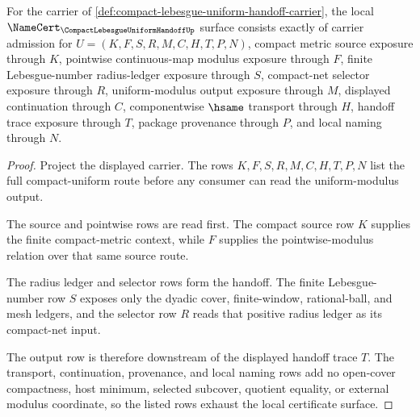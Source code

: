 \begin{theorem}
\label{thm:compact-lebesgue-uniform-handoff-namecert-obligations}
For the carrier of \autoref{def:compact-lebesgue-uniform-handoff-carrier}, the local $\NameCert_{\CompactLebesgueUniformHandoffUp}$ surface consists exactly of carrier admission for $U=(K,F,S,R,M,C,H,T,P,N)$, compact metric source exposure through $K$, pointwise continuous-map modulus exposure through $F$, finite Lebesgue-number radius-ledger exposure through $S$, compact-net selector exposure through $R$, uniform-modulus output exposure through $M$, displayed continuation through $C$, componentwise $\hsame$ transport through $H$, handoff trace exposure through $T$, package provenance through $P$, and local naming through $N$.
\end{theorem}
\begin{proof}
Project the displayed carrier. The rows $K,F,S,R,M,C,H,T,P,N$ list the full compact-uniform route before any consumer can read the uniform-modulus output.

The source and pointwise rows are read first. The compact source row $K$ supplies the finite compact-metric context, while $F$ supplies the pointwise-modulus relation over that same source route.

The radius ledger and selector rows form the handoff. The finite Lebesgue-number row $S$ exposes only the dyadic cover, finite-window, rational-ball, and mesh ledgers, and the selector row $R$ reads that positive radius ledger as its compact-net input.

The output row is therefore downstream of the displayed handoff trace $T$. The transport, continuation, provenance, and local naming rows add no open-cover compactness, host minimum, selected subcover, quotient equality, or external modulus coordinate, so the listed rows exhaust the local certificate surface.
\end{proof}

